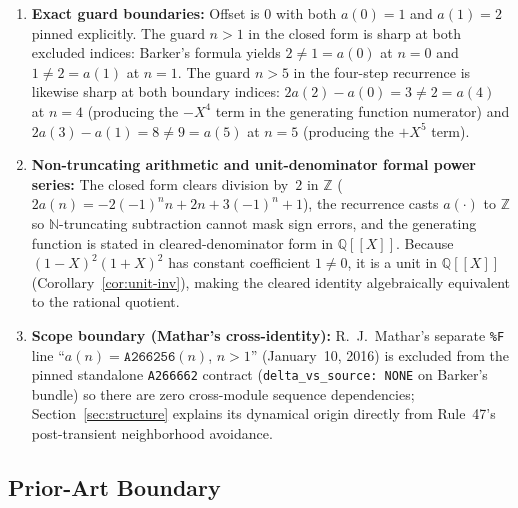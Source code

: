 \documentclass[11pt]{article}
\newcommand{\llbracket}{[\![}
\newcommand{\rrbracket}{]\!]}
\theoremstyle{definition}
\newcommand{\N}{\mathbb{N}}
\newcommand{\Z}{\mathbb{Z}}
\newcommand{\Q}{\mathbb{Q}}
\newcommand{\seq}[1]{\texttt{#1}}
\begin{document}
\begin{enumerate}
\item \textbf{Exact guard boundaries:} Offset is $0$ with both $a(0) = 1$ and $a(1) = 2$ pinned explicitly. The guard $n > 1$ in the closed form is sharp at both excluded indices: Barker's formula yields $2 \ne 1 = a(0)$ at $n = 0$ and $1 \ne 2 = a(1)$ at $n = 1$. The guard $n > 5$ in the four-step recurrence is likewise sharp at both boundary indices: $2a(2) - a(0) = 3 \ne 2 = a(4)$ at $n = 4$ (producing the $-X^4$ term in the generating function numerator) and $2a(3) - a(1) = 8 \ne 9 = a(5)$ at $n = 5$ (producing the $+X^5$ term).
\item \textbf{Non-truncating arithmetic and unit-denominator formal power series:} The closed form clears division by~$2$ in $\Z$ ($2 a(n) = -2(-1)^n n + 2n + 3(-1)^n + 1$), the recurrence casts $a(\cdot)$ to $\Z$ so $\N$-truncating subtraction cannot mask sign errors, and the generating function is stated in cleared-denominator form in $\Q\llbracket X \rrbracket$. Because $(1 - X)^2(1 + X)^2$ has constant coefficient $1 \ne 0$, it is a unit in $\Q\llbracket X \rrbracket$ (Corollary~\ref{cor:unit-inv}), making the cleared identity algebraically equivalent to the rational quotient.
\item \textbf{Scope boundary (Mathar's cross-identity):} R.~J.\ Mathar's separate \texttt{\%F} line ``$a(n) = \seq{A266256}(n)$, $n > 1$'' (January~10, 2016) is excluded from the pinned standalone \seq{A266662} contract (\texttt{delta\_vs\_source: NONE} on Barker's bundle) so there are zero cross-module sequence dependencies; Section~\ref{sec:structure} explains its dynamical origin directly from Rule~47's post-transient neighborhood avoidance.
\end{enumerate}

\subsection{Prior-Art Boundary}
\label{sec:prior-art}
\end{document}

